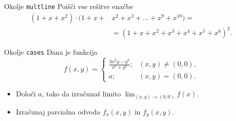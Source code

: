 \begin{frame}{Okolje \texttt{multline}}
	Poišči vse rešitve enačbe
	\begin{align*}
		(1+x+x^2) \cdot (1+x+&x^2+x^3+\ldots+x^9+x^{10}) = \\
		&=(1+x+x^2+x^3+x^4+x^5+x^6)^2.
	\end{align*}

\end{frame}

\begin{frame}{Okolje \texttt{cases}}
	Dana je funkcija
	$$f(x,y)=
	\begin{cases}
		\frac{3x^2y-y^3}{x^2+y^2}; &(x,y) \ne (0,0)\text{,}\\
		a; &(x,y) = (0,0).
	\end{cases}$$

	\begin{itemize}
	\item Določi $a$, tako da izračunaš limito \( \lim_{(x,y)\to(0,0)} f(x). \)
	\item Izračunaj parcialna odvoda $f_x(x,y)$ in $f_y(x,y)$.
	\end{itemize}
\end{frame}
